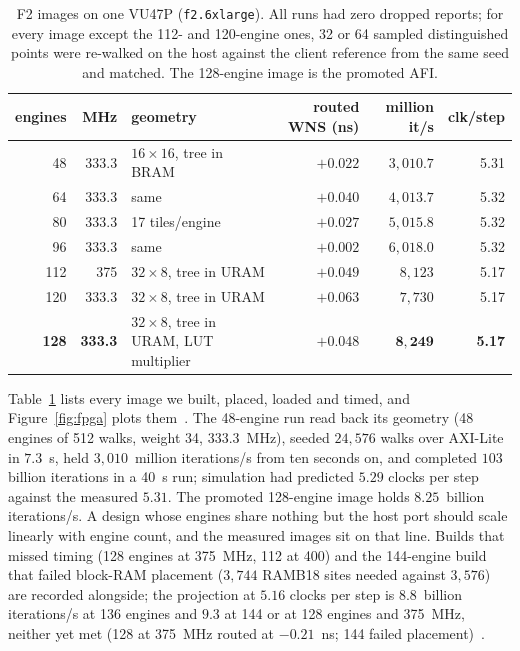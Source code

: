 \begin{table}[t]
\centering
\small
\caption{F2 images on one VU47P (\texttt{f2.6xlarge}). All runs had
  zero dropped reports; for every image except the 112- and 120-engine
  ones, 32 or 64 sampled distinguished points were re-walked on the
  host against the client reference from the same seed and matched.
  The 128-engine image is the promoted AFI.}
\label{tab:fpga-images}
\begin{tabular}{@{}rrlrrr@{}}
\toprule
engines & MHz & geometry & routed WNS (ns) & million it/s & clk/step \\
\midrule
48 & 333.3 & $16\times16$, tree in BRAM & $+0.022$ & $3{,}010.7$ & 5.31 \\
64 & 333.3 & same & $+0.040$ & $4{,}013.7$ & 5.32 \\
80 & 333.3 & 17 tiles/engine & $+0.027$ & $5{,}015.8$ & 5.32 \\
96 & 333.3 & same & $+0.002$ & $6{,}018.0$ & 5.32 \\
112 & 375 & $32\times8$, tree in URAM & $+0.049$ & $8{,}123$ & 5.17 \\
120 & 333.3 & $32\times8$, tree in URAM & $+0.063$ & $7{,}730$ & 5.17 \\
\textbf{128} & \textbf{333.3} & $32\times8$, tree in URAM, LUT multiplier & $+0.048$ & $\mathbf{8{,}249}$ & \textbf{5.17} \\
\bottomrule
\end{tabular}
\end{table}

Table~\ref{tab:fpga-images} lists every image we built, placed,
loaded and timed, and Figure~\ref{fig:fpga} plots them~.
The 48-engine run read back its geometry (48 engines of 512 walks,
weight 34, $333.3$~MHz), seeded $24{,}576$ walks over AXI-Lite in
$7.3$~s, held $3{,}010$~million iterations/s from ten seconds on, and completed
$103$ billion iterations in a 40~s run; simulation had predicted $5.29$
clocks per step against the measured $5.31$. The promoted 128-engine
image holds $8.25$~billion iterations/s. A design whose engines share nothing but
the host port should scale linearly with engine count, and the
measured images sit on that line. Builds that missed
timing (128 engines at 375~MHz, 112 at 400) and the 144-engine build
that failed block-RAM placement ($3{,}744$ RAMB18 sites needed against
$3{,}576$) are recorded alongside; the projection at $5.16$ clocks per step is $8.8$~billion iterations/s at 136 engines
and $9.3$ at 144 or at 128 engines and 375~MHz, neither yet met (128
at 375~MHz routed at $-0.21$~ns; 144 failed
placement)~.

